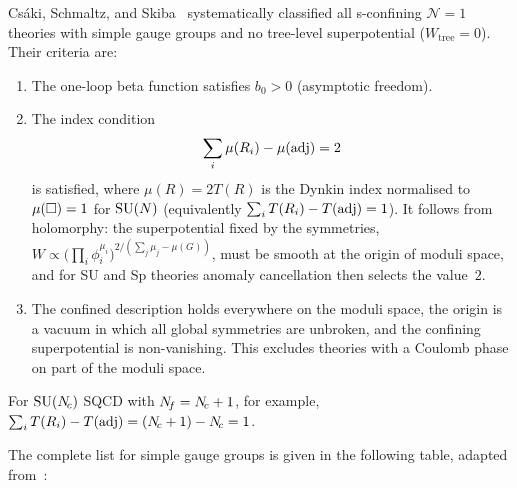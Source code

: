 \documentclass[11pt,a4paper]{article}
\begin{document}
Cs\'aki, Schmaltz, and Skiba~\cite{CSS9610139} systematically
classified all s-confining $\mathcal{N}=1$ theories with simple
gauge groups and no tree-level superpotential ($W_{\text{tree}} = 0$).
Their criteria are:
\begin{enumerate}
  \item The one-loop beta function satisfies $b_0 > 0$
    (asymptotic freedom).
  \item The index condition
    \[
      \sum_i \mu(R_i) - \mu(\mathrm{adj}) = 2
    \]
    is satisfied, where $\mu(R) = 2T(R)$ is the Dynkin index
    normalised to $\mu(\square) = 1$ for $\mathrm{SU}(N)$ (equivalently
    $\sum_i T(R_i) - T(\mathrm{adj}) = 1$).  It follows from holomorphy: the
    superpotential fixed by the symmetries,
    $W \propto \bigl(\prod_i \phi_i^{\mu_i}\bigr)^{2/(\sum_j \mu_j -
    \mu(G))}$, must be smooth at the origin of moduli space, and for SU
    and Sp theories anomaly cancellation then selects the value~$2$.
  \item The confined description holds everywhere on the moduli space,
    the origin is a vacuum in which all global symmetries are unbroken,
    and the confining superpotential is non-vanishing.  This excludes
    theories with a Coulomb phase on part of the moduli space.
\end{enumerate}
For $\mathrm{SU}(N_{\!c})$ SQCD with $N_{\!f} = N_{\!c} + 1$, for example,
$\sum_i T(R_i) - T(\mathrm{adj}) = (N_{\!c} + 1) - N_{\!c} = 1$.

The complete list for simple gauge groups is given in the following
table, adapted from~\cite{CSS9610139}:

\medskip
\end{document}
